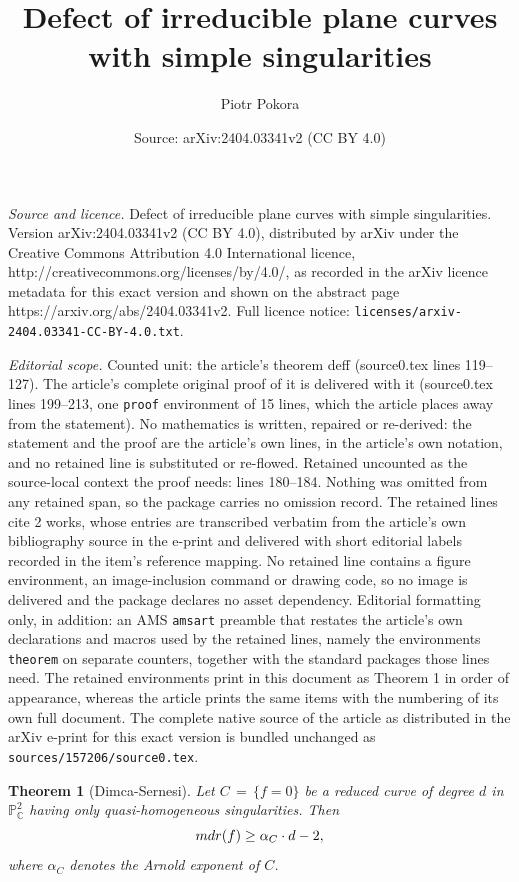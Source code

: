 \documentclass[10pt,a4paper]{amsart}
\title{Defect of irreducible plane curves with simple singularities}
\author{Piotr Pokora}
\date{Source: arXiv:2404.03341v2 (CC BY 4.0)}
\newtheorem{theorem}{Theorem}
\begin{document}
\maketitle

\noindent\emph{Source and licence.} Defect of irreducible plane curves with simple singularities. Version arXiv:2404.03341v2 (CC BY 4.0), distributed by arXiv under the Creative Commons Attribution 4.0 International licence, http://creativecommons.org/licenses/by/4.0/, as recorded in the arXiv licence metadata for this exact version and shown on the abstract page https://arxiv.org/abs/2404.03341v2. Full licence notice: \texttt{licenses/arxiv-2404.03341-CC-BY-4.0.txt}.\par\smallskip

\noindent\textit{Editorial scope.} Counted unit: the article's theorem deff (source0.tex lines 119--127). The article's complete original proof of it is delivered with it (source0.tex lines 199--213, one \texttt{proof} environment of 15 lines, which the article places away from the statement). No mathematics is written, repaired or re-derived: the statement and the proof are the article's own lines, in the article's own notation, and no retained line is substituted or re-flowed.  Retained uncounted as the source-local context the proof needs: lines 180--184.  Nothing was omitted from any retained span, so the package carries no omission record.  The retained lines cite 2 works, whose entries are transcribed verbatim from the article's own bibliography source in the e-print and delivered with short editorial labels recorded in the item's reference mapping.  No retained line contains a figure environment, an image-inclusion command or drawing code, so no image is delivered and the package declares no asset dependency.  Editorial formatting only, in addition: an AMS \texttt{amsart} preamble that restates the article's own declarations and macros used by the retained lines, namely the environments \texttt{theorem} on separate counters, together with the standard packages those lines need.  The retained environments print in this document as Theorem 1 in order of appearance, whereas the article prints the same items with the numbering of its own full document.  The complete native source of the article as distributed in the arXiv e-print for this exact version is bundled unchanged as \texttt{sources/157206/source0.tex}.
\begin{theorem}[Dimca-Sernesi]
\label{sern}
Let $C \, = \, \{ f=0 \}$ be a reduced curve of degree $d$ in $\mathbb{P}^{2}_{\mathbb{C}}$ having only quasi-homogeneous singularities. Then $${\rm mdr}(f) \geq \alpha_{C}\cdot d - 2,$$
where $\alpha_{C}$ denotes the Arnold exponent of $C$.
\end{theorem}
\end{document}
